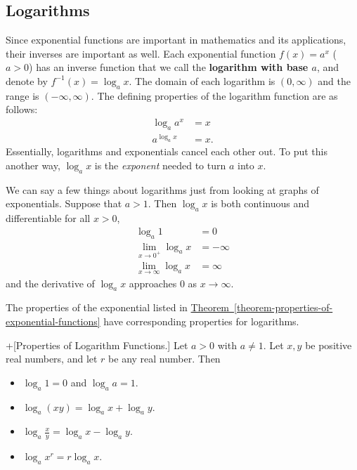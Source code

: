 \documentclass[10pt,]{book}
\newcommand{\terminology}[1]{\textbf{#1}}
\theoremstyle{ptxplainnotitle}
\theoremstyle{ptxplaintitle}
\theoremstyle{ptxplainnotitle}
\theoremstyle{ptxplaintitle}
\theoremstyle{ptxplainnotitle}
\theoremstyle{ptxplaintitle}
\theoremstyle{ptxdefinitionnotitle}
\theoremstyle{ptxdefinitiontitle}
\theoremstyle{ptxdefinitionnotitle}
\theoremstyle{ptxdefinitiontitle}
\theoremstyle{ptxdefinitionnotitle}
\theoremstyle{ptxdefinitiontitle}
\theoremstyle{ptxdefinitionnotitle}
\theoremstyle{ptxdefinitiontitle}
\theoremstyle{ptxdefinitionnotitle}
\theoremstyle{ptxdefinitiontitle}
\numberwithin{equation}{section}
\begin{document}
\subsection[{Logarithms}]{Logarithms}\label{subsection-logarithms}
\hypertarget{p-217}{}%
Since exponential functions are important in mathematics and its applications, their inverses are important as well. Each exponential function \(f(x) = a^{x}\) (\(a> 0\)) has an inverse function that we call the \terminology{logarithm with base \(a\)}, and denote by \(f^{-1}(x) = \log_{a}x\). The domain of each logarithm is \((0,\infty)\) and the range is \((-\infty,\infty)\). The defining properties of the logarithm function are as follows:%
\begin{align*}
\log_{a}a^{x} & = x \\
a^{\log_{a}x} & = x. 
\end{align*}
Essentially, logarithms and exponentials cancel each other out. To put this another way, \(\log_{a}x\) is the \emph{exponent} needed to turn \(a\) into \(x\).%
\par
\hypertarget{p-218}{}%
We can say a few things about logarithms just from looking at graphs of exponentials. Suppose that \(a>1\). Then \(\log_{a}x\) is both continuous and differentiable for all \(x>0\),%
\begin{align*}
\log_{a}1 & = 0 \\
\lim_{x\to0^{+}}\log_{a}x & = -\infty \\
\lim_{x\to\infty}\log_{a}x & = \infty 
\end{align*}
and the derivative of \(\log_{a}x\) approaches \(0\) as \(x\to\infty\).%
\par
\hypertarget{p-219}{}%
The properties of the exponential listed in \hyperref[theorem-properties-of-exponential-functions]{Theorem~\ref{theorem-properties-of-exponential-functions}} have corresponding properties for logarithms.%
\begin{theorem}+[{Properties of Logarithm Functions.}]\label{theorem-properties-of-logarithm-functions}
\hypertarget{p-220}{}%
Let \(a>0\) with \(a\neq1\). Let \(x,y\) be positive real numbers, and let \(r\) be any real number. Then \leavevmode%
\begin{itemize}[label=\textbullet]
\item{}\(\log_{a}1 = 0\) and \(\log_{a}a = 1\).%
\item{}\(\log_{a}(xy) = \log_{a}x + \log_{a}y\).%
\item{}\(\log_{a}\frac{x}{y} = \log_{a}x - \log_{a}y\).%
\item{}\(\log_{a}x^{r} = r\log_{a}x\).%
\end{itemize}
%
\end{theorem}
\end{document}
